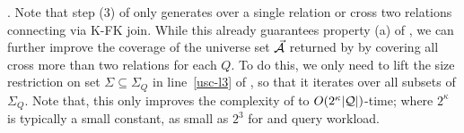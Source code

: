 {.
Note that step (3) of \usc only generates \bss over a single
relation or cross two relations connecting via K-FK join. While
this already guarantees property (a) of \usc, we can further
improve the coverage of the universe set $\vec{{\mathcal A}}$ returned by
\usc by covering all \bss cross more than two relations for each
$Q$. To do this, we only need to lift the size restriction on set
$\Sigma\subseteq \Sigma_{Q}$ in line~\ref{usc-l3} of \usc, so
that it iterates over all subsets of $\Sigma_{Q}$. Note that,
this only improves the complexity of \usc to
$O(2^{\kappa}|{\mathcal Q}|)$-time; where $2^{\kappa}$ is typically a
small constant, \eg as small as $2^{3}$ for \tpch and \tpcds
query workload.}%

